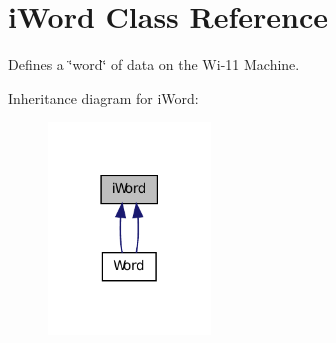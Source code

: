 \hypertarget{classiWord}{
\section{iWord Class Reference}
\label{classiWord}
}


Defines a \char`\"{}word\char`\"{} of data on the Wi-\/11 Machine.  




Inheritance diagram for iWord:\nopagebreak
\begin{figure}[H]
\begin{center}
\leavevmode
\includegraphics[width=122pt]{classiWord__inherit__graph}
\end{center}
\end{figure}
